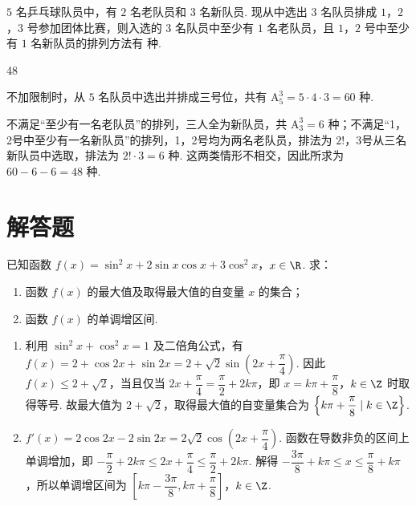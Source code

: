 \begin{problem}
\(5\) 名乒乓球队员中，有 \(2\) 名老队员和 \(3\) 名新队员. 现从中选出 \(3\) 名队员排成 \(1\)，\(2\)，\(3\) 号参加团体比赛，则入选的 \(3\) 名队员中至少有 \(1\) 名老队员，且 \(1\)，\(2\) 号中至少有 \(1\) 名新队员的排列方法有\fillinblank{} 种.
\end{problem}

\begin{answer}
48
\end{answer}

\begin{solution}
不加限制时，从 \(5\) 名队员中选出并排成三号位，共有 \(\mathrm A_5^3=5\cdot4\cdot3=60\) 种.

不满足“至少有一名老队员”的排列，三人全为新队员，共 \(\mathrm A_3^3=6\) 种；不满足“1，2号中至少有一名新队员”的排列，1，2号均为两名老队员，排法为 \(2!\)，3号从三名新队员中选取，排法为 \(2!\cdot3=6\) 种. 这两类情形不相交，因此所求为 \(60-6-6=48\) 种.
\end{solution}

\section{解答题}
\begin{problem}
已知函数 \(f(x) = \sin^2 x + 2\sin x\cos x + 3\cos^2 x\)，\(x \in \R\). 求：

\begin{enumerate}
\item 函数 \( f(x) \) 的最大值及取得最大值的自变量 \( x \) 的集合；
\item 函数 \( f(x) \) 的单调增区间.
\end{enumerate}
\end{problem}

\begin{solution}
\begin{enumerate}
\item 利用 \(\sin^2x+\cos^2x=1\) 及二倍角公式，有 \(f(x)=2+\cos2x+\sin2x=2+\sqrt2\sin\left(2x+\dfrac{\pi}{4}\right)\). 因此 \(f(x)\leqslant2+\sqrt2\)，当且仅当 \(2x+\dfrac{\pi}{4}=\dfrac{\pi}{2}+2k\pi\)，即 \(x=k\pi+\dfrac{\pi}{8}\)，\(k\in\Z\) 时取得等号. 故最大值为 \(2+\sqrt2\)，取得最大值的自变量集合为 \(\left\{k\pi+\dfrac{\pi}{8}\mid k\in\Z\right\}\).
\item \(f'(x)=2\cos2x-2\sin2x=2\sqrt2\cos\left(2x+\dfrac{\pi}{4}\right)\). 函数在导数非负的区间上单调增加，即 \(-\dfrac{\pi}{2}+2k\pi\leqslant2x+\dfrac{\pi}{4}\leqslant\dfrac{\pi}{2}+2k\pi\). 解得 \(-\dfrac{3\pi}{8}+k\pi\leqslant x\leqslant\dfrac{\pi}{8}+k\pi\)，所以单调增区间为 \(\left[k\pi-\dfrac{3\pi}{8},k\pi+\dfrac{\pi}{8}\right]\)，\(k\in\Z\).
\end{enumerate}
\end{solution}

